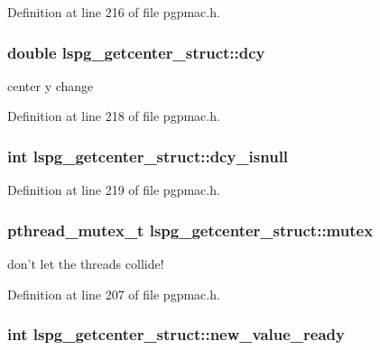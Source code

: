 Definition at line 216 of file pgpmac.\-h.

\hypertarget{structlspg__getcenter__struct_a55b1a488b714e6a40d8e06a6e182bd0a}{
\subsubsection[{dcy}]{\setlength{\rightskip}{0pt plus 5cm}double lspg\-\_\-getcenter\-\_\-struct\-::dcy}}\label{structlspg__getcenter__struct_a55b1a488b714e6a40d8e06a6e182bd0a}


center y change 



Definition at line 218 of file pgpmac.\-h.

\hypertarget{structlspg__getcenter__struct_a352c48c8d443c52f18ebd13019d01684}{
\subsubsection[{dcy\-\_\-isnull}]{\setlength{\rightskip}{0pt plus 5cm}int lspg\-\_\-getcenter\-\_\-struct\-::dcy\-\_\-isnull}}\label{structlspg__getcenter__struct_a352c48c8d443c52f18ebd13019d01684}


Definition at line 219 of file pgpmac.\-h.

\hypertarget{structlspg__getcenter__struct_a214bb7e88b137162f13f41f2c43002a9}{
\subsubsection[{mutex}]{\setlength{\rightskip}{0pt plus 5cm}pthread\-\_\-mutex\-\_\-t lspg\-\_\-getcenter\-\_\-struct\-::mutex}}\label{structlspg__getcenter__struct_a214bb7e88b137162f13f41f2c43002a9}


don't let the threads collide! 



Definition at line 207 of file pgpmac.\-h.

\hypertarget{structlspg__getcenter__struct_a4b350f11f1e375b9e9e839caaffbcb6b}{
\subsubsection[{new\-\_\-value\-\_\-ready}]{\setlength{\rightskip}{0pt plus 5cm}int lspg\-\_\-getcenter\-\_\-struct\-::new\-\_\-value\-\_\-ready}}\label{structlspg__getcenter__struct_a4b350f11f1e375b9e9e839caaffbcb6b}


